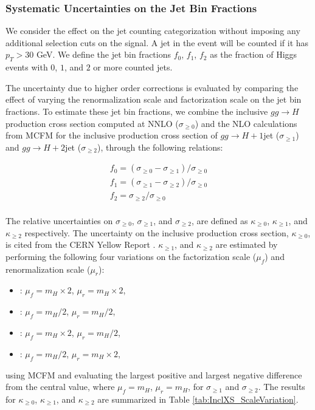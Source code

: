 \subsubsection{Systematic Uncertainties on the Jet Bin Fractions}
We consider the effect on the jet counting categorization without imposing any additional
selection cuts on the signal. A jet in the event will be counted if it has $p_{T} > 30$ GeV. 
We define the jet bin fractions $f_{0}$, $f_{1}$, $f_{2}$
as the fraction of Higgs events with $0$, $1$, and $2$ or more counted jets. 

The uncertainty due to higher order corrections is evaluated by comparing the effect of
varying the renormalization scale and factorization scale on the jet bin fractions. To 
estimate these jet bin fractions, we combine the inclusive $gg \to H$ production cross section
computed at NNLO \cite{} ($\sigma_{\geq 0}$) and the NLO calculations from MCFM \cite{} for 
the inclusive production cross section of $gg \to H+1$jet ($\sigma_{\geq 1}$) and 
$gg \to H+2$jet ($\sigma_{\geq 2}$), through the following relations:

\begin{eqnarray}
\label{eqn:jetBinFractions}
  f_{0} = (\sigma_{\geq 0} - \sigma_{\geq 1} ) / \sigma_{\geq 0} \\
  f_{1} = (\sigma_{\geq 1} - \sigma_{\geq 2} ) / \sigma_{\geq 0} \\
  f_{2} = \sigma_{\geq 2} / \sigma_{\geq 0} \\
\end{eqnarray}

The relative uncertainties on $\sigma_{\geq 0}$, $\sigma_{\geq 1}$, and $\sigma_{\geq 2}$, are defined as 
$\kappa_{\geq 0}$, $\kappa_{\geq 1}$, and $\kappa_{\geq 2}$ respectively. The uncertainty on the inclusive
production cross section, $\kappa_{\geq 0}$, is cited from the CERN Yellow Report \cite{}. 
$\kappa_{\geq 1}$, and $\kappa_{\geq 2}$ are estimated by performing the following four variations on
the factorization scale ($\mu_{f}$) and renormalization scale ($\mu_{r}$):

\begin{itemize}
\item: $\mu_{f} = m_{H} \times 2$, $\mu_{r} = m_{H} \times 2$,
\item: $\mu_{f} = m_{H} / 2$, $\mu_{r} = m_{H} / 2$,
\item: $\mu_{f} = m_{H} \times 2$, $\mu_{r} = m_{H} / 2$,
\item: $\mu_{f} = m_{H} / 2$, $\mu_{r} = m_{H} \times 2$,

\end{itemize}
using MCFM and evaluating the largest positive and largest negative difference from the central
value, where $\mu_{f} = m_{H}$, $\mu_{r} = m_{H}$, for $\sigma_{\geq 1}$ and $\sigma_{\geq 2}$. The results
for $\kappa_{\geq 0}$, $\kappa_{\geq 1}$, and $\kappa_{\geq 2}$ are summarized in Table 
\ref{tab:InclXS_ScaleVariation}.




